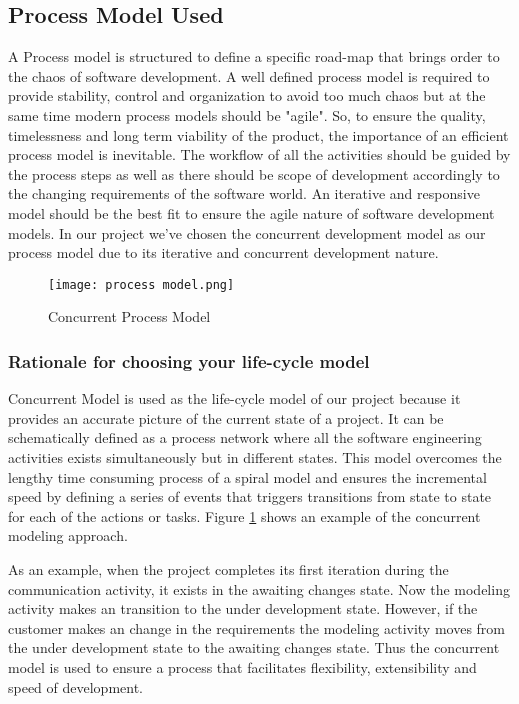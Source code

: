 \documentclass[11pt]{article} %
\begin{document}
	\subsection{Process Model Used}
	A Process model is structured to define a specific road-map that brings order to the chaos of software development. A well defined process model is required to provide stability, control and organization to avoid too much chaos but at the same time modern process models should be "agile". So, to ensure the quality, timelessness and long term viability of the product, the importance of an efficient process model is inevitable. The workflow of all the activities should be guided by the process steps as well as there should be scope of development accordingly to the changing requirements of the software world. An iterative and responsive model should be the best fit to ensure the agile nature of software development models. In our project we've chosen the concurrent development model as our process model due to its iterative and concurrent development nature.   
	\begin{figure}[!hbt]
		 \centering
        \texttt{[image: process model.png]} \par 
        \caption{Concurrent Process Model}
        \label{fig:process model}
    \end{figure}
		\subsubsection{Rationale for choosing your life-cycle model }
		Concurrent Model is used as the life-cycle model of our project because it provides an accurate picture of the current state of a project. It can be schematically defined as a  process network where all the software engineering activities exists simultaneously but in different states. This model overcomes the lengthy time consuming process of a spiral model and ensures the incremental speed by defining a series of events that triggers transitions from state to state for each of the actions or tasks. Figure \ref{fig:process model} shows an example of the concurrent modeling approach.


	    As an example, when the project completes its first iteration during the communication activity, it exists in the awaiting changes state. Now the modeling activity makes an transition to the under development state. However, if the customer makes an change in the requirements the modeling activity moves from the under development state to the awaiting changes state. Thus the concurrent model is used to ensure a process that facilitates flexibility, extensibility and speed of development.
	
\end{document}
